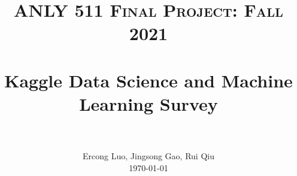 \title{
	\normalfont \normalsize \textsc{ANLY 511 Final Project: Fall 2021} \\ [25pt]
	\horrule{1pt} \\[0.3cm]
	\LARGE Kaggle Data Science and Machine Learning Survey\\
	\horrule{1pt} \\[0.2cm]
}
\author{
	\normalfont 								\normalsize
	Ercong Luo, Jingsong Gao, Rui Qiu\\[-3pt] \normalsize
	\today
}
\date{\vspace{-3ex}}

\maketitle


	
